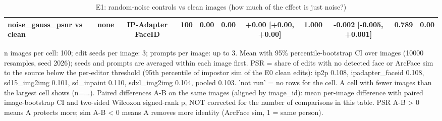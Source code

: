 \begin{table}[t]
{\begin{tabular}{lcccccccccc}
noise\_gauss\_psnr vs clean & none & IP-Adapter FaceID & 100 & 0.00 & 0.00 & +0.00 [+0.00, +0.00] & 1.000 & -0.002 [-0.005, +0.001] & 0.789 & 0.00 \\
\bottomrule
\end{tabular}
}
\caption{E1: random-noise controls vs clean images (how much of the effect is just noise?)}
\label{tab:e1}
\par\footnotesize n images per cell: 100; edit seeds per image: 3; prompts per image: up to 3. Mean with 95\% percentile-bootstrap CI over images (10000 resamples, seed 2026); seeds and prompts are averaged within each image first. PSR = share of edits with no detected face or ArcFace sim to the source below the per-editor threshold (95th percentile of impostor sim of the E0 clean edits): ip2p 0.108, ipadapter\_faceid 0.108, sd15\_img2img 0.101, sd\_inpaint 0.110, sdxl\_img2img 0.104, pooled 0.103. 'not run' = no rows for the cell. A cell with fewer images than the largest cell shows (n=...). Paired differences A-B on the same images (aligned by image\_id): mean per-image difference with paired image-bootstrap CI and two-sided Wilcoxon signed-rank p, NOT corrected for the number of comparisons in this table. PSR A-B > 0 means A protects more; sim A-B < 0 means A removes more identity (ArcFace sim, 1 = same person).
\end{table}

